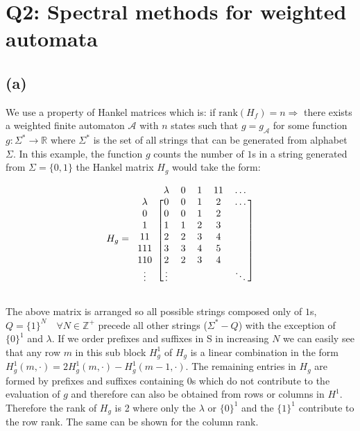 \documentclass[11pt]{amsart}
\begin{document}

\section{Q2: Spectral methods for weighted automata}
\subsection{(a)}

We use a property of Hankel matrices which is: if $\text{rank}(H_f) = n \Rightarrow$ there exists a weighted finite automaton $\mathcal{A}$  with $n$ states such that $g = g_{\mathcal{A}}$ for some function $g : \Sigma^{*} \rightarrow \mathbb{R}$ where $\Sigma^{*}$ is the set of all strings that can be generated from alphabet $\Sigma$. In this example, the function $g$ counts the number of $1$s in a string generated from $\Sigma = \{0, 1\}$ the Hankel matrix $H_g$ would take the form: 


 
\[
H_g = \begin{blockarray}{cccccc}
\def\ra{\color{red}\ba}
 & \lambda & 0 & 1 & 11 & \hdots \\
\begin{block}{c[ccccc]}
  \lambda & 0 & 0 & 1 & 2 & \hdots \\
  0 & 0 & 0 & 1 & 2 &  \\
  1 & 1 & 1 & 2 & 3 &  \\
  11 & 2 & 2 & 3 & 4 &  \\
  111 & 3 & 3 & 4 & 5 &  \\
  110 & 2 & 2 & 3 & 4 &  \\
  \vdots & \vdots &  &  &  & \ddots \\
\end{block}
\end{blockarray}
\label{mat:h_1}
 \]

The above matrix is arranged so all possible strings composed only of $1$s, $Q = \{1\}^N \quad \forall N \in \mathbb{Z^+}$ precede all other strings ($\Sigma^{*} - Q$) with the exception of $\{0\}^1$ and $\lambda$. If we order prefixes and suffixes in S in increasing $N$ we can easily see that any row $m$ in this sub block $H^{1}_g$ of $H_g$ is a linear combination in the form $H^{1}_g(m, \cdot) = 2H^{1}_g(m, \cdot) - H^{1}_g(m-1, \cdot)$. The remaining entries in $H_g$ are formed by prefixes and suffixes containing $0$s which do not contribute to the evaluation of $g$ and therefore can also be obtained from rows or columns in $H^{1}$. Therefore the rank of $H_g$ is 2 where only the $\lambda$ or $\{0\}^1$ and the $\{1\}^1$ contribute to the row rank. The same can be shown for the column rank.
\end{document}
